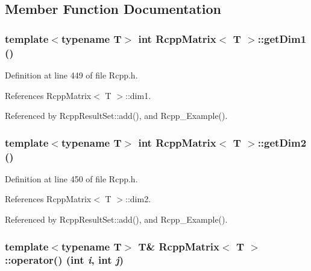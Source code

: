 \subsection{Member Function Documentation}
\hypertarget{classRcppMatrix_edbe27d643d704a0f5a995821307fdaf}{
\subsubsection[getDim1]{\setlength{\rightskip}{0pt plus 5cm}template$<$typename T$>$ int {\bf RcppMatrix}$<$ T $>$::getDim1 ()}}
\label{classRcppMatrix_edbe27d643d704a0f5a995821307fdaf}




Definition at line 449 of file Rcpp.h.

References RcppMatrix$<$ T $>$::dim1.

Referenced by RcppResultSet::add(), and Rcpp\_\-Example().\hypertarget{classRcppMatrix_356e04f844e3ebfac29b50e2e749734f}{
\subsubsection[getDim2]{\setlength{\rightskip}{0pt plus 5cm}template$<$typename T$>$ int {\bf RcppMatrix}$<$ T $>$::getDim2 ()}}
\label{classRcppMatrix_356e04f844e3ebfac29b50e2e749734f}




Definition at line 450 of file Rcpp.h.

References RcppMatrix$<$ T $>$::dim2.

Referenced by RcppResultSet::add(), and Rcpp\_\-Example().\hypertarget{classRcppMatrix_7733c87524d7e216f70fc10ccc971a29}{
\subsubsection[operator()]{\setlength{\rightskip}{0pt plus 5cm}template$<$typename T$>$ T\& {\bf RcppMatrix}$<$ T $>$::operator() (int {\em i}, \/  int {\em j})}}
\label{classRcppMatrix_7733c87524d7e216f70fc10ccc971a29}




